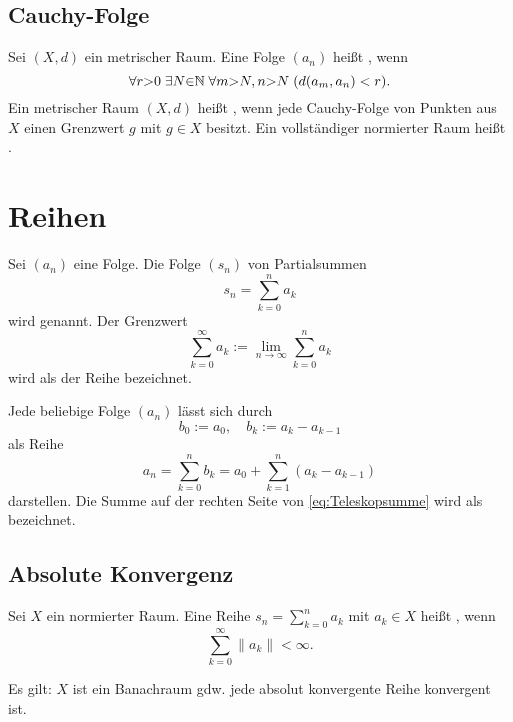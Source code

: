 \subsection{Cauchy-Folge}
\begin{definition}\mbox{}\newline
Sei $(X,d)$ ein metrischer Raum.
Eine Folge $(a_n)$ heißt , wenn
\begin{equation}
\forall r{>}0\;\exists N{\in}\mathbb N\;\forall m{>}N,n{>}N\;
(d(a_m,a_n)<r).
\end{equation}
\noindent
Ein metrischer Raum $(X,d)$ heißt ,
wenn jede Cauchy-Folge von Punkten aus $X$ einen Grenzwert $g$
mit $g\in X$ besitzt. Ein vollständiger normierter Raum heißt
.
\end{definition}

\clearpage
\section{Reihen}
\begin{definition}[Reihe]\mbox{}\newline
Sei $(a_n)$ eine Folge. Die Folge $(s_n)$ von
Partialsummen%
\begin{equation}
s_n = \sum_{k=0}^n a_k
\end{equation}
wird  genannt. Der Grenzwert
\begin{equation}
\sum_{k=0}^\infty a_k := \lim_{n\to\infty}\sum_{k=0}^n a_k
\end{equation}
wird als  der Reihe bezeichnet.
\end{definition}
Jede beliebige Folge $(a_n)$ lässt sich durch
\begin{equation}
b_0:=a_0,\quad b_k:=a_k-a_{k-1}
\end{equation}
als Reihe
\begin{equation}\label{eq:Teleskopsumme}
a_n = \sum_{k=0}^n b_k = a_0+\sum_{k=1}^n (a_k-a_{k-1})
\end{equation}
darstellen. Die Summe auf der rechten Seite von \eqref{eq:Teleskopsumme}
wird als  bezeichnet.

\subsection{Absolute Konvergenz}
\begin{definition}\mbox{}\newline
Sei $X$ ein normierter Raum.
Eine Reihe $s_n=\sum_{k=0}^n a_k$ mit $a_k\in X$
heißt , wenn
\begin{equation}\label{eq:absolut-convergence}\textstyle
\sum_{k=0}^\infty \|a_k\| < \infty.
\end{equation}
\end{definition}
\noindent
Es gilt: $X$ ist ein Banachraum gdw. jede absolut konvergente
Reihe konvergent ist.

